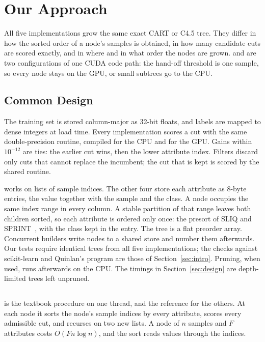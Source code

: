 \section{Our Approach}
\label{sec:impl}

All five implementations grow the same exact CART or C4.5 tree. They differ in how the sorted order of a node's samples is obtained, in how many candidate cuts are scored exactly, and in where and in what order the nodes are grown. \ImplGpu{} and \ImplHybrid{} are two configurations of one CUDA code path: the hand-off threshold is one sample, so every node stays on the GPU, or small subtrees go to the CPU.

\subsection{Common Design}
\label{sec:impl-common}

The training set is stored column-major as 32-bit floats, and labels are mapped to dense integers at load time. Every implementation scores a cut with the same double-precision routine, compiled for the CPU and for the GPU. Gains within \(10^{-12}\) are ties: the earlier cut wins, then the lower attribute index. Filters discard only cuts that cannot replace the incumbent; the cut that is kept is scored by the shared routine.

\ImplSerialBase{} works on lists of sample indices. The other four store each attribute as 8-byte entries, the value together with the sample and the class. A node occupies the same index range in every column. A stable partition of that range leaves both children sorted, so each attribute is ordered only once: the presort of SLIQ and SPRINT~\cite{mehta1996sliq,shafer1996sprint}, with the class kept in the entry. The tree is a flat preorder array. Concurrent builders write nodes to a shared store and number them afterwards. Our tests require identical trees from all five implementations; the checks against scikit-learn and Quinlan's program are those of Section~\ref{sec:intro}. Pruning, when used, runs afterwards on the CPU. The timings in Section~\ref{sec:design} are depth-limited trees left unpruned.

\subsection{\ImplSerialBase}
\label{sec:impl-simple}

\ImplSerialBase{} is the textbook procedure on one thread, and the reference for the others. At each node it sorts the node's sample indices by every attribute, scores every admissible cut, and recurses on two new lists. A node of \(n\) samples and \(F\) attributes costs \(O(Fn\log n)\), and the sort reads values through the indices.

